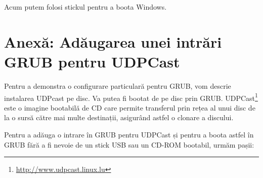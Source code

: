 Acum putem folosi stickul pentru a boota Windows.

\section{Anexă: Adăugarea unei intrări GRUB pentru UDPCast}
\label{sec:boot:updcast}

Pentru a demonstra o configurare particulară pentru GRUB, vom descrie instalarea
UDPcast pe disc. Va putea fi bootat de pe disc prin GRUB.
UDPCast\footnote{\url{http://www.udpcast.linux.lu}} este o imagine bootabilă de
CD care permite transferul prin rețea al unui disc de la o sursă către mai multe
destinații, asigurând astfel o clonare a discului.

Pentru a adăuga o intrare în GRUB pentru UDPCast și pentru a boota astfel în
GRUB fără a fi nevoie de un stick USB sau un CD-ROM bootabil, urmăm pașii:

